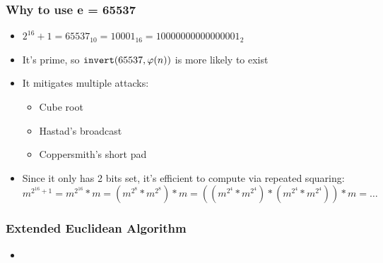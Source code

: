 \documentclass[aspectratio=169]{beamer}
\begin{document}
\begin{frame}[fragile]
\frametitle{Why to use e = 65537}
\begin{itemize}
\item $2^{16}+1 = 65537_{10} = 10001_{16} = 10000000000000001_2$
\item It's prime, so $\verb|invert|(65537, \varphi(n))$ is more likely to exist
\item It mitigates multiple attacks:
\begin{itemize}
\item Cube root
\item Hastad's broadcast
\item Coppersmith's short pad
\end{itemize}
\item Since it only has 2 bits set, it's efficient to compute via repeated squaring:
$m^{2^{16}+1} = m^{2^{16}}*m = (m^{2^8}*m^{2^8})*m = ((m^{2^4}*m^{2^4})*(m^{2^4}*m^{2^4}))*m = \hdots$
\end{itemize}
\end{frame}

\begin{frame}[fragile]
\frametitle{Extended Euclidean Algorithm}
\begin{itemize}
\item {}
\end{itemize}
\end{frame}
\end{document}
